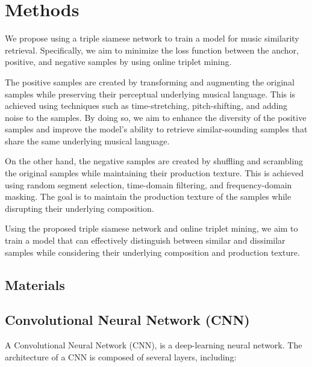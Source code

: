 \chapter{Methods}

We propose using a triple siamese network to train a model for music similarity retrieval. Specifically, we aim to minimize the loss function between the anchor, positive, and negative samples by using online triplet mining.

The positive samples are created by transforming and augmenting the original samples while preserving their perceptual underlying musical language. This is achieved using techniques such as time-stretching, pitch-shifting, and adding noise to the samples. By doing so, we aim to enhance the diversity of the positive samples and improve the model's ability to retrieve similar-sounding samples that share the same underlying musical language.

On the other hand, the negative samples are created by shuffling and scrambling the original samples while maintaining their production texture. This is achieved using random segment selection, time-domain filtering, and frequency-domain masking. The goal is to maintain the production texture of the samples while disrupting their underlying composition.

Using the proposed triple siamese network and online triplet mining, we aim to train a model that can effectively distinguish between similar and dissimilar samples while considering their underlying composition and production texture.

\section{Materials}

\section{Convolutional Neural Network (CNN)}

A Convolutional Neural Network (CNN), is a deep-learning neural network. The architecture of a CNN is composed of several layers, including:

